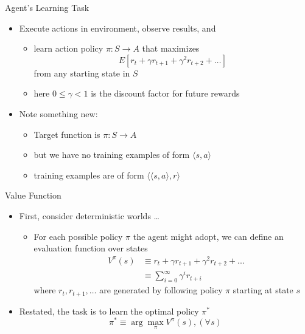 \documentclass[%
pdf,
colorBG,
slideColor,
tcrico,
]{prosper}
\begin{document}
\begin{slide}{Agent's Learning Task } 

\begin{itemize}
 \item  Execute actions in environment, observe results, and
  \begin{itemize}
  \item learn action policy $\pi : S \rightarrow A$ that maximizes
  \[ E[r_t + \gamma r_{t+1} + \gamma^2 r_{t+2} + \ldots ] \]
  from any starting state in $S$
  \item here $0 \leq \gamma < 1$ is the discount factor for future rewards
  \end{itemize}
\item  Note something new:
  \begin{itemize}
  \item Target function is $\pi : S \rightarrow A$
  \item but we have no training examples of form $\langle s, a \rangle$
  \item training examples are of form $\langle \langle  s, a \rangle , r \rangle$
  \end{itemize}
\end{itemize}
\end{slide}
\begin{slide}{Value Function } 

\begin{itemize}
 \item  First, consider deterministic worlds \dots

\begin{itemize}
 \item For each possible policy $\pi$ the agent might adopt, we can define an evaluation function over states
  \begin{eqnarray}
  & V^{\pi}(s) & \equiv r_{t} + \gamma r_{t+1} + \gamma^{2} r_{t+2} + ...
  \nonumber \\ 
  & & \equiv \sum_{i=0}^{\infty} \gamma^{i} r_{t+i} \nonumber
  \end{eqnarray}
where $ r_{t}, r_{t+1}, \ldots$ are generated by following policy $\pi$ starting at state $s$
  \end{itemize}
  \item  Restated, the task is to learn the optimal policy $\pi^{*}$
\[  \pi^{*} \equiv \arg\max_{\pi} V^{\pi}(s), (\forall s) \]
\end{itemize}
\end{slide}
\end{document}
